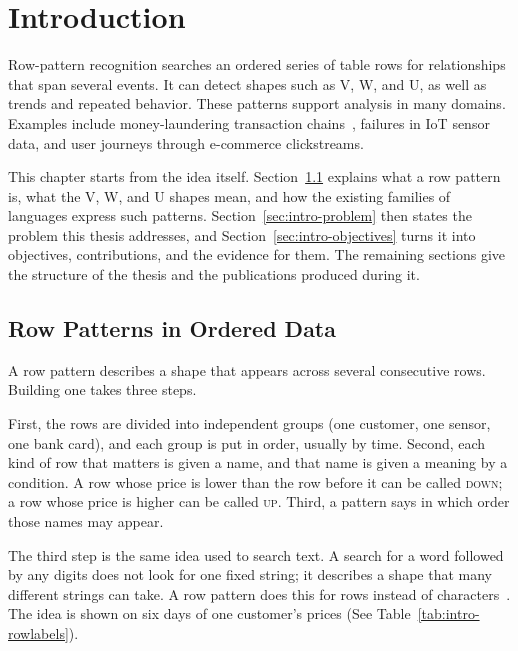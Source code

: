 \chapter{Introduction}
\label{chap:intro}
Row-pattern recognition searches an ordered series of table rows for
relationships that span several events.  It can detect shapes such as V, W,
and U, as well as trends and repeated behavior.  These patterns support
analysis in many domains.  Examples include money-laundering
transaction chains~\cite{petkovic2022fraud}, failures in IoT sensor data, and
user journeys through e-commerce clickstreams.

This chapter starts from the idea itself.  Section~\ref{sec:intro-rowpatterns}
explains what a row pattern is, what the V, W, and U shapes mean, and how the
existing families of languages express such patterns.
Section~\ref{sec:intro-problem} then states the problem this thesis
addresses, and Section~\ref{sec:intro-objectives} turns it into objectives,
contributions, and the evidence for them.  The remaining sections give the
structure of the thesis and the publications produced during it.


\section{Row Patterns in Ordered Data}
\label{sec:intro-rowpatterns}
A row pattern describes a shape that appears across several consecutive
rows.  Building one takes three steps.

First, the rows are divided into independent groups (one customer, one sensor,
one bank card), and each group is put in order, usually by time.
Second, each kind of row that matters is given a name, and that name is
given a meaning by a condition.  A row whose price is lower than the row
before it can be called \textsc{down}; a row whose price is higher can be
called \textsc{up}.  Third, a pattern says in which order those names may
appear.

The third step is the same idea used to search text.  A search for a word
followed by any digits does not look for one fixed string; it describes a
shape that many different strings can take.  A row pattern does this for
rows instead of characters~\cite{winand_match_recognize,zemke2007pattern}.
The idea is shown on six days of one customer's prices (See
Table~\ref{tab:intro-rowlabels}).

